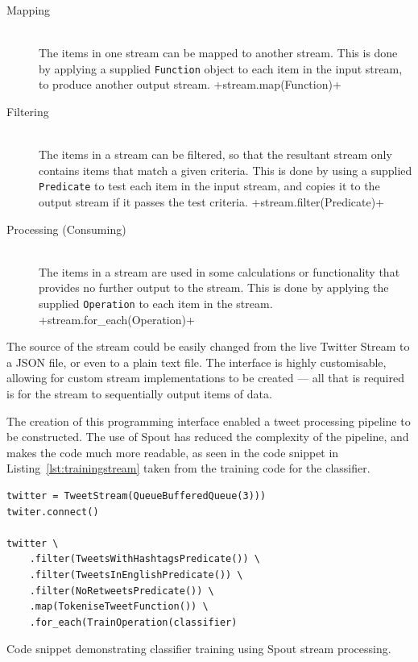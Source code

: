 \documentclass[11pt,a4paper]{report}
\begin{document}
\begin{description}
    \item[Mapping] \hfill \\
        The items in one stream can be mapped to another stream. This is done by applying a supplied \verb+Function+ object to each item in the input stream, to produce another output stream.
        +stream.map(Function)+
    \item[Filtering] \hfill \\
        The items in a stream can be filtered, so that the resultant stream only contains items that match a given criteria. This is done by using a supplied \verb+Predicate+ to test each item in the input stream, and copies it to the output stream if it passes the test criteria.
        +stream.filter(Predicate)+
    \item[Processing (Consuming)] \hfill \\
        The items in a stream are used in some calculations or functionality that provides no further output to the stream. This is done by applying the supplied \verb+Operation+ to each item in the stream.
        +stream.for_each(Operation)+
\end{description}

The source of the stream could be easily changed from the live Twitter Stream to a JSON file, or even to a plain text file. The interface is highly customisable, allowing for custom stream implementations to be created --- all that is required is for the stream to sequentially output items of data.

The creation of this programming interface enabled a tweet processing pipeline to be constructed. The use of Spout has reduced the complexity of the pipeline, and makes the code much more readable, as seen in the code snippet in Listing~\ref{lst:trainingstream} taken from the training code for the classifier.

\begin{listing}[htpb]
    \begin{verbatim}
twitter = TweetStream(QueueBufferedQueue(3)))
twiter.connect()

twitter \
    .filter(TweetsWithHashtagsPredicate()) \
    .filter(TweetsInEnglishPredicate()) \
    .filter(NoRetweetsPredicate()) \
    .map(TokeniseTweetFunction()) \
    .for_each(TrainOperation(classifier)
    \end{verbatim}
    \caption{Code snippet demonstrating classifier training using Spout stream processing.}
    \label{lst:trainingstream}
\end{listing}
\end{document}
